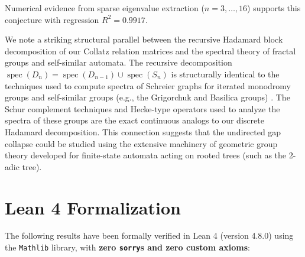 \documentclass[11pt,reqno]{amsart}
\theoremstyle{definition}
\begin{document}
Numerical evidence from sparse eigenvalue extraction ($n = 3, \ldots, 16$) supports this conjecture with regression $R^2 = 0.9917$.

We note a striking structural parallel between the recursive Hadamard block decomposition of our Collatz relation matrices and the spectral theory of fractal groups and self-similar automata. The recursive decomposition $\operatorname{spec}(D_n) = \operatorname{spec}(D_{n-1}) \cup \operatorname{spec}(S_n)$ is structurally identical to the techniques used to compute spectra of Schreier graphs for iterated monodromy groups and self-similar groups (e.g., the Grigorchuk and Basilica groups) \cite{bartholdi2003, nekrashevych2005}. The Schur complement techniques and Hecke-type operators used to analyze the spectra of these groups are the exact continuous analogs to our discrete Hadamard decomposition. This connection suggests that the undirected gap collapse could be studied using the extensive machinery of geometric group theory developed for finite-state automata acting on rooted trees (such as the 2-adic tree).

\section{Lean 4 Formalization}

The following results have been formally verified in Lean 4 (version 4.8.0) using the \texttt{Mathlib} library, with \textbf{zero \texttt{sorry}s and zero custom axioms}:
\end{document}
